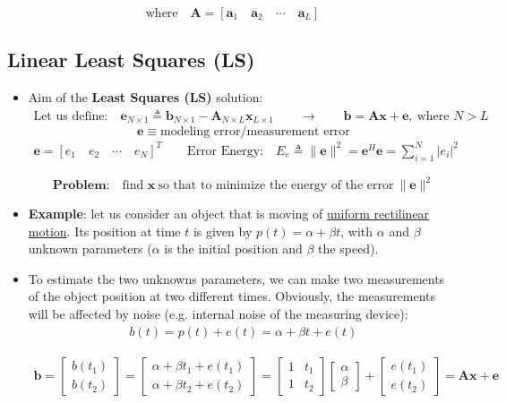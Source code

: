 \begin{itemize}
\[
\text{where} \quad \mathbf{A} =
\left[ \mathbf{a}_1 \quad \mathbf{a}_2 \quad \cdots \quad \mathbf{a}_L \right]
\]
\end{itemize}
\subsection{Linear Least Squares (LS)}
\begin{itemize}
    \item Aim of the \textbf{Least Squares (LS)} solution:
\begin{align*}
\text{Let us define:} \quad
\mathbf{e}_{N \times 1} \triangleq \mathbf{b}_{N \times 1} - \mathbf{A}_{N \times L} \mathbf{x}_{L \times 1}
\qquad\rightarrow\qquad
\mathbf{b} = \mathbf{A}\mathbf{x} + \mathbf{e},\ \text{where } N > L
\end{align*}
\vspace{-1em}
\[
\mathbf{e} \equiv \text{modeling error/measurement error}
\]
\vspace{-1em}
\begin{align*}
\mathbf{e} = [e_1 \quad e_2 \quad \cdots \quad e_N]^T
\qquad
\text{Error Energy:}\quad
E_e \triangleq \|\mathbf{e}\|^2 = \mathbf{e}^H\mathbf{e} = \sum_{i=1}^N |e_i|^2
\end{align*}

\[
\textbf{Problem:} \quad \text{find } \mathbf{x}\ \text{so that to minimize the energy of the error}\ \|\mathbf{e}\|^2
\]
    \item \textbf{Example}: let us consider an object that is moving of \underline{uniform rectilinear motion}. Its position at time \(t\) is given by \(p(t)=\alpha+\beta t\), with \(\alpha\) and \(\beta\) unknown parameters (\(\alpha\) is the initial position and \(\beta\) the speed).
    \item To estimate the two unknowns parameters, we can make two measurements of the object position at two different times. Obviously, the measurements will be affected by noise (e.g. internal noise of the measuring device):
    \begin{align*}
b(t) = p(t) + e(t) = \alpha + \beta t + e(t)
\end{align*}

\begin{align*}
\mathbf{b} =
\begin{bmatrix}
b(t_1) \\
b(t_2)
\end{bmatrix}
=
\begin{bmatrix}
\alpha + \beta t_1 + e(t_1) \\
\alpha + \beta t_2 + e(t_2)
\end{bmatrix}
=
\begin{bmatrix}
1 & t_1 \\
1 & t_2
\end{bmatrix}
\begin{bmatrix}
\alpha \\
\beta
\end{bmatrix}
+
\begin{bmatrix}
e(t_1) \\
e(t_2)
\end{bmatrix}
= \mathbf{A}\mathbf{x} + \mathbf{e}
\end{align*}


\end{itemize}
